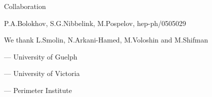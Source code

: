 \documentclass[pdf,PItalk,slideColor,colorBG,accumulate]{prosper}
\begin{document}

{
\begin{slide}[Blinds]{ Collaboration }
{\red\fontsize{10pt}{18pt}\selectfont
\qquad P.A.Bolokhov, S.G.Nibbelink, M.Pospelov, hep-ph/0505029

\qquad We thank L.Smolin, N.Arkani-Hamed, M.Voloshin and M.Shifman

\qquad --- University of Guelph

\qquad --- University of Victoria

\qquad --- Perimeter Institute

}

\end{slide}
}

\end{document}
